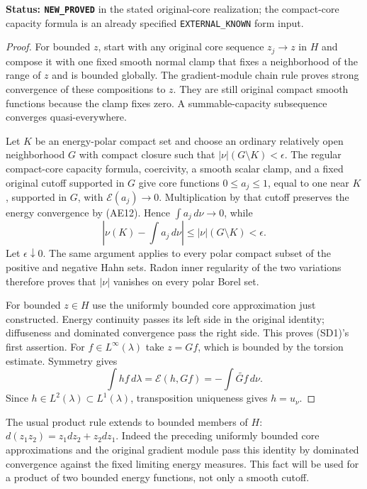 \documentclass[11pt,a4paper]{article}
\numberwithin{equation}{section}
\theoremstyle{definition}
\theoremstyle{remark}
\begin{document}
\noindent\textbf{Status: \texttt{NEW\_PROVED}} in the stated
original-core realization; the compact-core capacity formula is
an already specified \texttt{EXTERNAL\_KNOWN} form input.

\begin{proof}
For bounded $z$, start with any original core sequence $z_j\to z$
in $H$ and compose it with one fixed smooth normal clamp that
fixes a neighborhood of the range of $z$ and is bounded globally.
The gradient-module chain rule proves strong convergence of these
compositions to $z$.  They are still original compact smooth
functions because the clamp fixes zero.  A summable-capacity
subsequence converges quasi-everywhere.

Let $K$ be an energy-polar compact set and choose an ordinary
relatively open neighborhood $G$ with compact closure such that
$|\nu|(G\setminus K)<\epsilon$.
The regular compact-core capacity formula, coercivity, a smooth
scalar clamp, and a fixed original cutoff supported in $G$
give core functions $0\le a_j\le1$, equal to one near $K$,
supported in $G$, with $\mathcal E(a_j)\to0$.
Multiplication by that cutoff preserves the energy convergence
by (AE12).  Hence $\int a_j\,d\nu\to0$, while
\[
       \left|\nu(K)-\int a_j\,d\nu\right|
                            \le |\nu|(G\setminus K)<\epsilon.
\]
Let $\epsilon\downarrow0$.  The same argument applies to every
polar compact subset of the positive and negative Hahn sets.
Radon inner regularity of the two variations therefore proves
that $|\nu|$ vanishes on every polar Borel set.

For bounded $z\in H$ use the uniformly bounded core
approximation just constructed.  Energy continuity passes its
left side in the original identity; diffuseness and dominated
convergence pass the right side.  This proves (SD1)'s first
assertion.  For $f\in L^\infty(\lambda)$ take $z=Gf$, which
is bounded by the torsion estimate.  Symmetry gives
\[
 \int h f\,d\lambda=\mathcal E(h,Gf)
                         =-\int\widetilde{Gf}\,d\nu.
\]
Since $h\in L^2(\lambda)\subset L^1(\lambda)$, transposition
uniqueness gives $h=u_\nu$.
\end{proof}

The usual product rule extends to bounded members of $H$:
$d(z_1z_2)=z_1dz_2+z_2dz_1$.  Indeed the preceding uniformly bounded
core approximations and the original gradient module pass this
identity by dominated convergence against the fixed limiting
energy measures.  This fact will be used for a product of two
bounded energy functions, not only a smooth cutoff.
\end{document}
